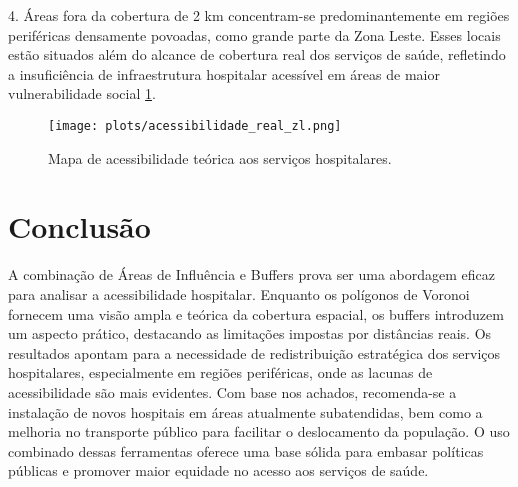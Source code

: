\documentclass[
  8pt,
]{article}
\begin{document}
\begin{multicols}{2}
4. Áreas fora da cobertura de 2 km concentram-se predominantemente em regiões periféricas densamente povoadas, como grande parte da Zona Leste. Esses locais estão situados além do alcance de cobertura real dos serviços de saúde, refletindo a insuficiência de infraestrutura hospitalar acessível em áreas de maior vulnerabilidade social \cref{fig:acessibilidade_real_zl}.

\begin{figure}[H]
    \centering
    \texttt{[image: plots/acessibilidade\_real\_zl.png]}
    \caption{Mapa de acessibilidade teórica aos serviços hospitalares.}
    \label{fig:acessibilidade_real_zl}
\end{figure}


\section{Conclusão}

A combinação de Áreas de Influência e Buffers prova ser uma abordagem eficaz para analisar a acessibilidade hospitalar. Enquanto os polígonos de Voronoi fornecem uma visão ampla e teórica da cobertura espacial, os buffers introduzem um aspecto prático, destacando as limitações impostas por distâncias reais. Os resultados apontam para a necessidade de redistribuição estratégica dos serviços hospitalares, especialmente em regiões periféricas, onde as lacunas de acessibilidade são mais evidentes.
Com base nos achados, recomenda-se a instalação de novos hospitais em áreas atualmente subatendidas, bem como a melhoria no transporte público para facilitar o deslocamento da população. O uso combinado dessas ferramentas oferece uma base sólida para embasar políticas públicas e promover maior equidade no acesso aos serviços de saúde.

\end{multicols}
\end{document}
